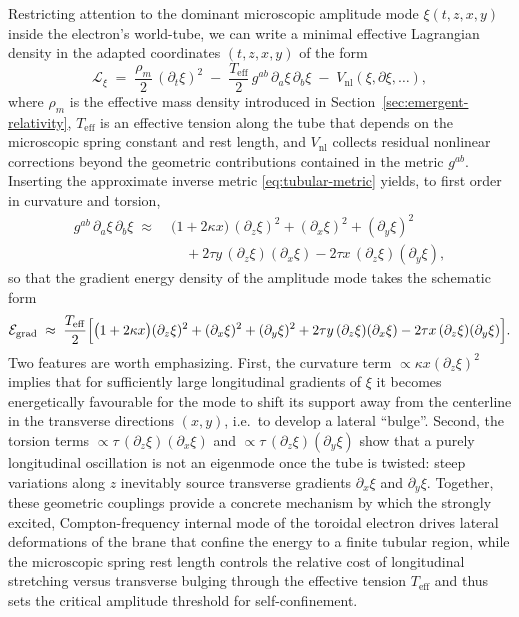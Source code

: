 Restricting attention to the dominant microscopic amplitude mode
$\xi(t,z,x,y)$ inside the electron's world-tube, we can write a
minimal effective Lagrangian density in the adapted coordinates
$(t,z,x,y)$ of the form
%
\begin{equation}
  \mathcal{L}_\xi
  \;=\;
  \frac{\rho_m}{2}\,(\partial_t \xi)^2
  \;-\;
  \frac{T_\mathrm{eff}}{2}\,g^{ab}\,\partial_a\xi\,\partial_b\xi
  \;-\;
  V_\mathrm{nl}(\xi,\partial\xi,\dots),
  \label{eq:xi-tubular-lagrangian}
\end{equation}
%
where $\rho_m$ is the effective mass density introduced in
Section~\ref{sec:emergent-relativity}, $T_\mathrm{eff}$ is an effective
tension along the tube that depends on the microscopic spring constant
and rest length, and $V_\mathrm{nl}$ collects residual nonlinear
corrections beyond the geometric contributions contained in the metric
$g^{ab}$. Inserting the approximate inverse metric
\eqref{eq:tubular-metric} yields, to first order in curvature and
torsion,
%
\begin{align}
  g^{ab}\,\partial_a\xi\,\partial_b\xi
  \;\approx\;
  &\bigl(1 + 2\kappa x\bigr)\,(\partial_z\xi)^2
  + (\partial_x\xi)^2
  + (\partial_y\xi)^2
  \nonumber\\[0.5ex]
  &\quad
  + 2\tau y\,(\partial_z\xi)(\partial_x\xi)
  - 2\tau x\,(\partial_z\xi)(\partial_y\xi),
  \label{eq:xi-gradient-tubular}
\end{align}
%
so that the gradient energy density of the amplitude mode takes the
schematic form
%
\begin{equation}
  \mathcal{E}_{\mathrm{grad}}
  \;\approx\;
  \frac{T_\mathrm{eff}}{2}\Bigl[
    \bigl(1+2\kappa x\bigr)(\partial_z\xi)^2
    + (\partial_x\xi)^2
    + (\partial_y\xi)^2
    + 2\tau y\,(\partial_z\xi)(\partial_x\xi)
    - 2\tau x\,(\partial_z\xi)(\partial_y\xi)
  \Bigr].
  \label{eq:xi-gradient-energy}
\end{equation}
%
Two features are worth emphasizing. First, the curvature term
$\propto\kappa x(\partial_z\xi)^2$ implies that for sufficiently
large longitudinal gradients of $\xi$ it becomes energetically
favourable for the mode to shift its support away from the
centerline in the transverse directions $(x,y)$, i.e.\ to develop a
lateral ``bulge''. Second, the torsion terms
$\propto\tau\,(\partial_z\xi)(\partial_x\xi)$ and
$\propto\tau\,(\partial_z\xi)(\partial_y\xi)$ show that a purely
longitudinal oscillation is not an eigenmode once the tube is twisted:
steep variations along $z$ inevitably source transverse gradients
$\partial_x\xi$ and $\partial_y\xi$. Together, these geometric
couplings provide a concrete mechanism by which the strongly excited,
Compton-frequency internal mode of the toroidal electron drives lateral
deformations of the brane that confine the energy to a finite tubular
region, while the microscopic spring rest length controls the relative
cost of longitudinal stretching versus transverse bulging through the
effective tension $T_\mathrm{eff}$ and thus sets the critical amplitude
threshold for self-confinement.


